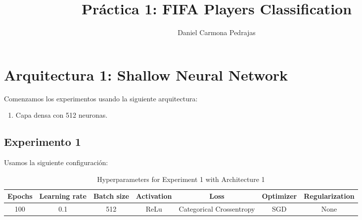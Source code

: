 \documentclass{article}
\begin{document}
\title{Pr\'actica 1: FIFA Players Classification}

\author{{Daniel Carmona Pedrajas}}

\date{}
\maketitle



\section{Arquitectura 1: Shallow Neural Network}
	Comenzamos los experimentos usando la siguiente arquitectura:
	\begin{enumerate}
		\item Capa densa con 512 neuronas.
	\end{enumerate}
	\subsection{Experimento 1}
		Usamos la siguiente configuraci\'on:
		\begin{table}[h]
			\begin{center}
				\begin{tabular}{ c | c | c | c | c | c | c}
					\textbf{Epochs} & \textbf{Learning rate} & \textbf{Batch size} & \textbf{Activation} & \textbf{Loss} & \textbf{Optimizer} & \textbf{Regularization} \\ \hline
					100 & 0.1 & 512 & ReLu & Categorical Crossentropy & SGD & None
				\end{tabular}
				\caption{Hyperparameters for Experiment 1 with Architecture 1}
				\label{tab:exp1-1}
			\end{center}
		\end{table}
\end{document}
